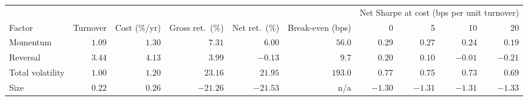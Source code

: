 \begin{tabular}{lrrrrrrrrr}
\toprule
& & & & & & \multicolumn{4}{c}{Net Sharpe at cost (bps per unit turnover)} \\
\cmidrule(lr){7-10}
Factor & Turnover & Cost (\%/yr) & Gross ret.\ (\%) & Net ret.\ (\%) & Break-even (bps) & 0 & 5 & 10 & 20 \\
\midrule
Momentum & $1.09$ & $1.30$ & $7.31$ & $6.00$ & $56.0$ & $0.29$ & $0.27$ & $0.24$ & $0.19$ \\
Reversal & $3.44$ & $4.13$ & $3.99$ & $-0.13$ & $9.7$ & $0.20$ & $0.10$ & $-0.01$ & $-0.21$ \\
Total volatility & $1.00$ & $1.20$ & $23.16$ & $21.95$ & $193.0$ & $0.77$ & $0.75$ & $0.73$ & $0.69$ \\
Size & $0.22$ & $0.26$ & $-21.26$ & $-21.53$ & n/a & $-1.30$ & $-1.31$ & $-1.31$ & $-1.33$ \\
\bottomrule
\end{tabular}
